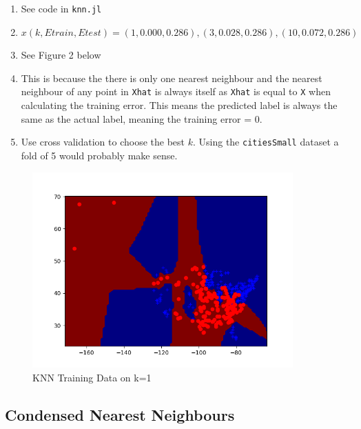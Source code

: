 \documentclass{article}
\def\enum#1{\begin{enumerate}#1\end{enumerate}}
\begin{document}
\enum{
	\item See code in \texttt{knn.jl}
	\item $x(k, Etrain, Etest) = (1, 0.000, 0.286), (3, 0.028, 0.286), (10, 0.072, 0.286)$
	\item See Figure 2 below
	\item This is because the there is only one nearest neighbour and the nearest neighbour of any point in \texttt{Xhat} is always itself as \texttt{Xhat} is equal to \texttt{X} when calculating the training error. This means the predicted label is always the same as the actual label, meaning the training error = 0.
	\item Use cross validation to choose the best $k$. Using the \texttt{citiesSmall} dataset a fold of 5 would probably make sense.
} 
\begin{figure}[h!]
  \includegraphics[height=7.5cm]{knn_train_data_k=1.png}
  \caption{KNN Training Data on k=1}
  \label{fig: knn}
\end{figure}

\subsection{Condensed Nearest Neighbours}
\end{document}
